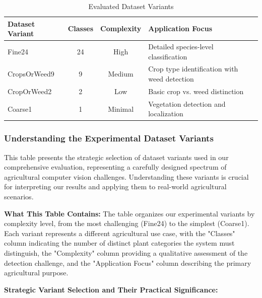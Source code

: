 \begin{table}[H]
\centering
\caption{Evaluated Dataset Variants}
\label{tab:evaluated_variants}
\begin{tabular}{@{}lccp{6cm}@{}}
\toprule
\textbf{Dataset Variant} & \textbf{Classes} & \textbf{Complexity} & \textbf{Application Focus} \\
\midrule
Fine24 & 24 & High & Detailed species-level classification \\
CropsOrWeed9 & 9 & Medium & Crop type identification with weed detection \\
CropOrWeed2 & 2 & Low & Basic crop vs. weed distinction \\
Coarse1 & 1 & Minimal & Vegetation detection and localization \\
\bottomrule
\end{tabular}
\end{table}

\subsubsection{Understanding the Experimental Dataset Variants}

This table presents the strategic selection of dataset variants used in our comprehensive evaluation, representing a carefully designed spectrum of agricultural computer vision challenges. Understanding these variants is crucial for interpreting our results and applying them to real-world agricultural scenarios.

\textbf{What This Table Contains:} The table organizes our experimental variants by complexity level, from the most challenging (Fine24) to the simplest (Coarse1). Each variant represents a different agricultural use case, with the "Classes" column indicating the number of distinct plant categories the system must distinguish, the "Complexity" column providing a qualitative assessment of the detection challenge, and the "Application Focus" column describing the primary agricultural purpose.

\textbf{Strategic Variant Selection and Their Practical Significance:}

